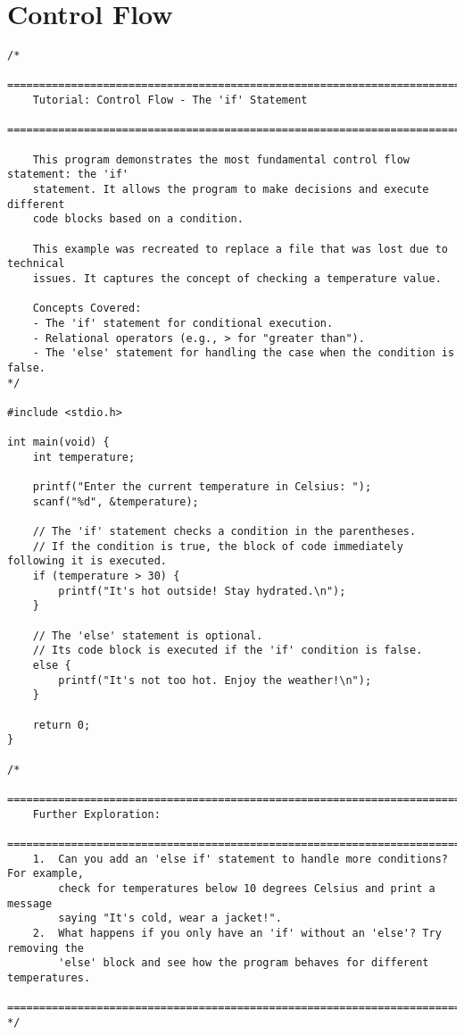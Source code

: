 \documentclass[11pt]{book}
\begin{document}
\chapter{Control Flow}
\clearpage
\begin{verbatim}
/*
    ================================================================================
    Tutorial: Control Flow - The 'if' Statement
    ================================================================================

    This program demonstrates the most fundamental control flow statement: the 'if'
    statement. It allows the program to make decisions and execute different
    code blocks based on a condition.

    This example was recreated to replace a file that was lost due to technical
    issues. It captures the concept of checking a temperature value.

    Concepts Covered:
    - The 'if' statement for conditional execution.
    - Relational operators (e.g., > for "greater than").
    - The 'else' statement for handling the case when the condition is false.
*/

#include <stdio.h>

int main(void) {
    int temperature;

    printf("Enter the current temperature in Celsius: ");
    scanf("%d", &temperature);

    // The 'if' statement checks a condition in the parentheses.
    // If the condition is true, the block of code immediately following it is executed.
    if (temperature > 30) {
        printf("It's hot outside! Stay hydrated.\n");
    }

    // The 'else' statement is optional.
    // Its code block is executed if the 'if' condition is false.
    else {
        printf("It's not too hot. Enjoy the weather!\n");
    }

    return 0;
}

/*
    ================================================================================
    Further Exploration:
    ================================================================================
    1.  Can you add an 'else if' statement to handle more conditions? For example,
        check for temperatures below 10 degrees Celsius and print a message
        saying "It's cold, wear a jacket!".
    2.  What happens if you only have an 'if' without an 'else'? Try removing the
        'else' block and see how the program behaves for different temperatures.
    ================================================================================
*/

\end{verbatim}
\end{document}

